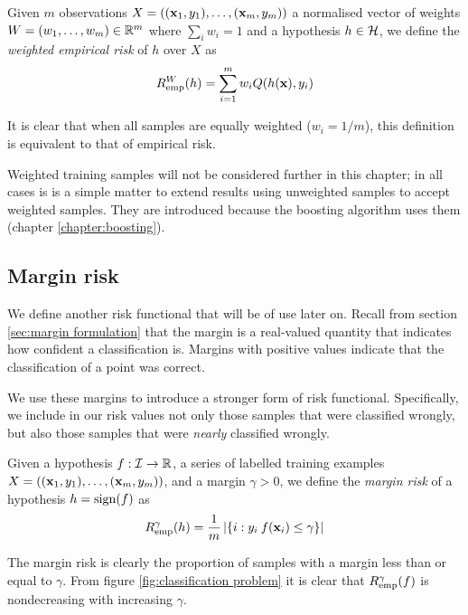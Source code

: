 \begin{definition}
\label{def:weighted empirical risk}
Given $m$ observations $X = ((\mathbf{x}_1, y_1), \ldots, (\mathbf{x}_m,
y_m))$ a normalised vector of weights $W = (w_1, \ldots, w_m) \in
\mathbb{R}^m$ where $\sum_{i} w_i = 1$ and a hypothesis $h \in
\mathcal{H}$, we define the \emph{weighted empirical risk} of $h$ over $X$ as 
%
\begin{equation}
R_{\mathrm{emp}}^W(h) = \sum_{i=1}^{m} w_i Q(h(\mathbf{x}), y_i)
\end{equation}
\end{definition}
%
It is clear that when all samples are equally weighted ($w_i = 1/m$),
this definition is equivalent to that of empirical risk.

Weighted training samples will not be considered further in this
chapter; in all cases is is a simple matter to extend results using
unweighted samples to accept weighted samples.  They are introduced
because the boosting algorithm uses them (chapter
\ref{chapter:boosting}).

\subsection{Margin risk}
\label{sec:margin risk}

We define another risk functional that will be of use later on.
Recall from section \ref{sec:margin formulation} that the margin is a
real-valued quantity that indicates how confident a classification
is.  Margins with positive values indicate that the classification of
a point was correct.

We use these margins to introduce a stronger form of risk functional.
Specifically, we include in our risk values not only those samples
that were classified wrongly, but also those samples that were
\emph{nearly} classified wrongly. 

\begin{definition}
\label{def:margin risk}
Given a hypothesis $f : \mathcal{I} \rightarrow \mathbb{R}$, a series of
labelled training examples $X = ((\mathbf{x}_1, y_1), \ldots, (\mathbf{x}_m, y_m))$,
and a margin $\gamma>0$, we define the \emph{margin risk} of a
hypothesis $h = \mathrm{sign}(f)$ as
%
\begin{equation}
R^{\gamma}_{\mathrm{emp}}(h) = \frac{1}{m} \left| \left\{ i : y_i \: f(\mathbf{x}_i) \leq
\gamma \right\} \right| 
\end{equation}
\end{definition}
%
The margin risk is clearly the proportion of samples with a margin
less than or equal to $\gamma$.  From figure \ref{fig:classification
problem} it is clear that $R^{\gamma}_{\mathrm{emp}}(f)$ is nondecreasing with
increasing $\gamma$.


